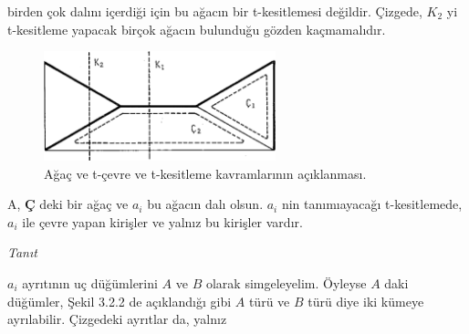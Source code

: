 \documentclass[11pt]{amsbook}
\begin{document}
birden çok dalını içerdiği için bu ağacın bir t-kesitlemesi değildir. Çizgede, $K_2$ yi t-kesitleme yapacak birçok ağacın bulunduğu gözden kaçmamalıdır. %

  \begin{figure}[htb]
  \centering
  \includegraphics[width=0.6\textwidth]{images/ceyhun-133-fig01}
  \caption{Ağaç ve t-çevre ve t-kesitleme kavramlarının açıklanması.}
  \label{fig:3.2.1}
  \end{figure}
  
  \begin{theorem}
  A, \textbf{Ç} deki bir ağaç ve $a_i$ bu ağacın dalı olsun. $a_i$ nin tanımıayacağı t-kesitlemede, $a_i$ ile çevre yapan kirişler ve yalnız bu kirişler vardır. 
  \end{theorem}
  
\textit{Tanıt}

$a_i$ ayrıtının uç düğümlerini $A$ ve $B$ olarak simgeleyelim. Öyleyse $A$ daki düğümler, Şekil 3.2.2 de açıklandığı gibi $A$ türü ve $B$ türü diye iki kümeye ayrılabilir. Çizgedeki ayrıtlar da, yalnız
\end{document}
